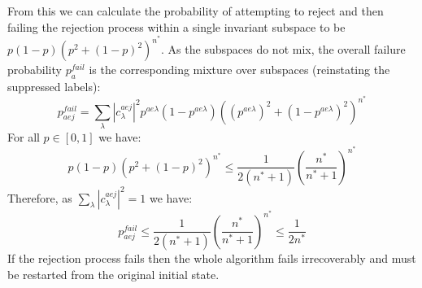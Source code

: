 \documentclass[aps,floatfix,10pt,amssymb,amsfont,amsmath,superscriptaddress,float,nofootinbib,longbibliography,nobalancelastpage,twocolumn]{revtex4-2}
\begin{document}
From this we can calculate the probability of attempting to reject and then failing the rejection process within a single invariant subspace to be $p(1-p)(p^2 +(1-p)^2)^{n^*}$. As the subspaces do not mix, the overall failure probability $p_a^{fail}$ is the corresponding mixture over subspaces (reinstating the suppressed labels):
\begin{equation}
   p_{aej}^{fail} =  \sum_{\lambda}|c^{aej}_{\lambda}|^2p^{ae\lambda}(1-p^{ae\lambda})((p^{ae\lambda})^2 +(1-p^{ae\lambda})^2)^{n^*}
\end{equation}
For all $p \in [0,1]$ we have: 
\begin{equation}
    p(1-p)(p^2 +(1-p)^2)^{n^*} \leq \frac{1}{2(n^*+1)} \left(\frac{n^*}{n^*+1}\right)^{n^*}
\end{equation}
Therefore, as $\sum_{\lambda}|c^{aej}_{\lambda}|^2=1$ we have:
\begin{equation}
    \label{eq:probabilty_of_rejection}
   p_{aej}^{fail} \leq \frac{1}{2(n^*+1)} \left(\frac{n^*}{n^*+1}\right)^{n^*} \leq \frac{1}{2n^*}
\end{equation}
If the rejection process fails then the whole algorithm fails irrecoverably and must be restarted from the original initial state.
\end{document}
